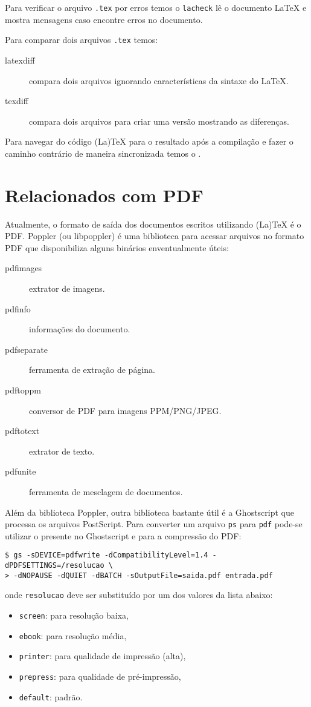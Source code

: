 Para verificar o arquivo \lstinline+.tex+ por erros temos o \lstinline{lacheck}
lê o documento LaTeX e mostra mensagens caso encontre erros no documento.

Para comparar dois arquivos \lstinline+.tex+ temos:
\begin{description}
  \item[latexdiff] compara dois arquivos ignorando características da sintaxe do
    LaTeX.
  \item[texdiff] compara dois arquivos para criar uma versão mostrando as
    diferenças.
\end{description}

Para navegar do código (La)TeX para o resultado após a compilação e fazer o
caminho contrário de maneira sincronizada temos o .

\section{Relacionados com PDF}
Atualmente, o formato de saída dos documentos escritos utilizando (La)TeX é o
PDF. Poppler (ou libpoppler) é uma biblioteca para acessar arquivos no formato
PDF que disponibiliza alguns binários enventualmente úteis:
\begin{description}
  \item[pdfimages] extrator de imagens.
  \item[pdfinfo] informações do documento.
  \item[pdfseparate] ferramenta de extração de página.
  \item[pdftoppm] conversor de PDF para imagens PPM/PNG/JPEG.
  \item[pdftotext] extrator de texto.
  \item[pdfunite] ferramenta de mesclagem de documentos.
\end{description}

Além da biblioteca Poppler, outra biblioteca bastante útil é a Ghostscript que
processa os arquivos PostScript. Para converter um arquivo \lstinline+ps+ para
\lstinline+pdf+ pode-se utilizar o  presente no Ghostscript e
para a compressão do PDF:
\begin{lstlisting}
$ gs -sDEVICE=pdfwrite -dCompatibilityLevel=1.4 -dPDFSETTINGS=/resolucao \
> -dNOPAUSE -dQUIET -dBATCH -sOutputFile=saida.pdf entrada.pdf
\end{lstlisting}
onde \lstinline+resolucao+ deve ser substituído por um dos valores da lista
abaixo:
\begin{itemize}
  \item \lstinline+screen+: para resolução baixa,
  \item \lstinline+ebook+: para resolução média,
  \item \lstinline+printer+: para qualidade de impressão (alta),
  \item \lstinline+prepress+: para qualidade de pré-impressão,
  \item \lstinline+default+: padrão.
\end{itemize}
